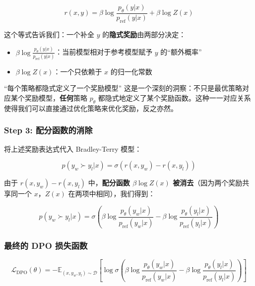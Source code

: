 \documentclass[a4paper]{article}
\begin{document}
$$r(x, y) = \beta \log \frac{p_\theta(y|x)}{p_{\text{ref}}(y|x)} + \beta \log Z(x)$$





这个等式告诉我们：一个补全 $y$ 的\textbf{隐式奖励}由两部分决定：
\begin{itemize}
    \item $\beta \log \frac{p_\theta(y|x)}{p_{\text{ref}}(y|x)}$：当前模型相对于参考模型赋予 $y$ 的``额外概率''
    \item $\beta \log Z(x)$：一个只依赖于 $x$ 的归一化常数
\end{itemize}

\begin{knowledgebox}{``每个策略都隐式定义了一个奖励模型''}
这是一个深刻的洞察：不只是最优策略对应某个奖励模型，\textbf{任何}策略 $p_\theta$ 都隐式地定义了某个奖励函数。这种一一对应关系使得我们可以直接通过优化策略来优化奖励，反之亦然。
\end{knowledgebox}

\subsubsection{Step 3: 配分函数的消除}

将上述奖励表达式代入 Bradley-Terry 模型：

$$p(y_w \succ y_l | x) = \sigma\left(r(x, y_w) - r(x, y_l)\right)$$

由于 $r(x, y_w) - r(x, y_l)$ 中，\textbf{配分函数 $\beta \log Z(x)$ 被消去}（因为两个奖励共享同一个 $x$，$Z(x)$ 在两项中相同），我们得到：

$$p(y_w \succ y_l | x) = \sigma\left(\beta \log \frac{p_\theta(y_w|x)}{p_{\text{ref}}(y_w|x)} - \beta \log \frac{p_\theta(y_l|x)}{p_{\text{ref}}(y_l|x)}\right)$$





\subsubsection{最终的 DPO 损失函数}

$$\boxed{\mathcal{L}_{\text{DPO}}(\theta) = -\mathbb{E}_{(x, y_w, y_l) \sim \mathcal{D}} \left[ \log \sigma\left(\beta \log \frac{p_\theta(y_w|x)}{p_{\text{ref}}(y_w|x)} - \beta \log \frac{p_\theta(y_l|x)}{p_{\text{ref}}(y_l|x)}\right) \right]}$$


\end{document}
